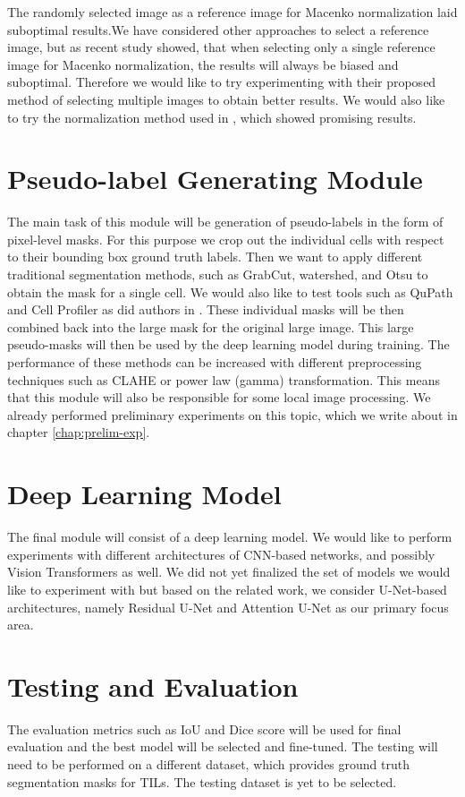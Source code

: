 The randomly selected image as a reference image for Macenko normalization laid suboptimal results.We have considered other approaches to select a reference image, but as recent study \cite{Ivanov2024} showed, that when selecting only a single reference image for Macenko normalization, the results will always be biased and suboptimal. Therefore we would like to try experimenting with their proposed method of selecting multiple images to obtain better results. We would also like to try the normalization method used in \cite{Vahadane2015}, which showed promising results.

\section{Pseudo-label Generating Module}
The main task of this module will be generation of pseudo-labels in the form of pixel-level masks. For this purpose we crop out the individual cells with respect to their bounding box ground truth labels. Then we want to apply different traditional segmentation methods, such as GrabCut, watershed, and Otsu to obtain the mask for a single cell. We would also like to test tools such as QuPath and Cell Profiler as did authors in \cite{Zhang2022}. These individual masks will be then combined back into the large mask for the original large image. This large pseudo-masks will then be used by the deep learning model during training. The performance of these methods can be increased with different preprocessing techniques such as CLAHE or power law (gamma) transformation. This means that this module will also be responsible for some local image processing. We already performed preliminary experiments on this topic, which we write about in chapter \ref{chap:prelim-exp}.

\section{Deep Learning Model}
The final module will consist of a deep learning model. We would like to perform experiments with different architectures of CNN-based networks, and possibly Vision Transformers as well. We did not yet finalized the set of models we would like to experiment with but based on the related work, we consider U-Net-based architectures, namely Residual U-Net and Attention U-Net as our primary focus area. 

\section{Testing and Evaluation}
The evaluation metrics such as IoU and Dice score will be used for final evaluation and the best model will be selected and fine-tuned. The testing will need to be performed on a different dataset, which provides ground truth segmentation masks for TILs. The testing dataset is yet to be selected.
